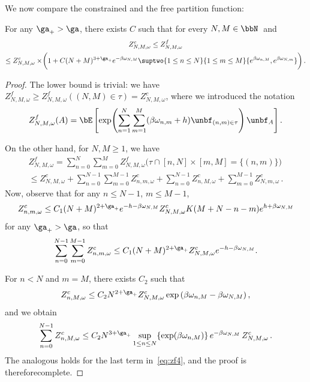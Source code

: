 We now compare the constrained and the free partition function:
\begin{lemm}\label{th:zfc}
For any $\ga_+ > \ga$, there exists $C$ such that for every $N,M \in \bbN$~and
\begin{multline}
Z^{c}_{N,M,\omega} \le Z^{f}_{N,M,\omega}\\
\le Z^{c}_{N,M,\omega}
\times \!\biggl(1 + C (N+M)^{3+\ga_+} e^{-\beta \omega_{N,M}} \suptwo{1 \le n \le N}{1 \le m \le M } \lbrace e^{\beta \omega_{n,M} }, e^{ \beta \omega_{N,m} } \rbrace \bigg)\,.
\end{multline}
\end{lemm}

\begin{proof}
The lower bound is trivial: we have $Z_{N,M,\omega}^{f} \geq Z^{f}_{N,M,\omega} ((N,M)\in\tau)=Z_{N,M,\omega}^{c}$, where we introduced the notation 
\[Z^{f}_{N,M,\omega} (A) =
\bE \left[\exp \!\left(\sum_{n=1}^N \sum_{m=1}^M (\beta \omega_{n,m} +h) \unbf_{(n,m) \in \tau} \right) \unbf_A \right].
\]

On the other hand, for $N,M \ge 1$, we have
\begin{multline}
Z^{f}_{N,M,\omega} = \sum_{n=0}^N \sum_{m=0}^{M} Z^{f}_{N,M,\omega} \big(\tau \cap [n,N] \times [m,M] = \lbrace (n,m) \rbrace \big) \\
\leq Z_{N,M,\omega}^c +\sum_{n=0}^{N-1} \sum_{m=0}^{M-1} Z_{n,m,\omega}^{c} + \sum_{n=0}^{N-1} Z_{n,M,\omega}^{c} +\sum_{m=0}^{M-1} Z_{N,m,\omega}^{c}\,.\label{eq:zf4}
\end{multline}
Now, observe that for any $n\leq N-1$, $m\leq M-1$,
\begin{equation}
Z^{c}_{n,m,\omega}
\le C_1 (N+M)^{2+ \ga_+} e^{ -h - \beta \omega_{N,M} } Z^{c}_{N,M,\omega} K (M+N -n-m) e^{ h+\beta \omega_{N,M} }
\end{equation}
for any $\ga_+ > \ga$, so that
\begin{equation}
\sum_{n=0}^{N-1} \sum_{m=0}^{M-1} Z^{c}_{n,m,\omega} \leq C_1 (N+M)^{2+ \ga_+} Z^{c}_{N,M,\omega}e^{-h - \beta \omega_{N,M} }.
\end{equation}

For $n < N$ and $m=M$, there exists $C_2$ such that
\begin{equation}
Z^{c}_{n,M,\omega} \le C_2 N^{2+\ga_+} Z^{c}_{N,M,\omega} \exp \left(\beta \omega_{n,M} - \beta \omega_{N,M} \right),
\end{equation}
and we obtain
\begin{equation}
\sum_{n=0}^{N-1} Z^{c}_{n,M,\omega} \le C_2 N ^{3 +\ga_+ } \sup_{1 \le n \le N} \lbrace \exp(\beta \omega_{n,M}) \rbrace\,e^{-\beta \omega_{N,M}}\,Z^{c}_{N,M,\omega}\,.
\end{equation}
The analogous holds for the last term in~\eqref{eq:zf4}, and the proof is therefore\linebreak complete.
\end{proof}


